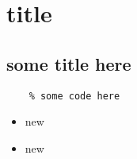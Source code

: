 \documentclass[a4paper,12pt]{article}
\begin{document}
    \title{}
    \author{text}
    \date{today}
    \maketitle

\section{title}

\subsection{some title here}

\begin{verbatim}
    % some code here
\end{verbatim}

\begin{itemize}
    \item new
    \item new
\end{itemize}
\end{document}
